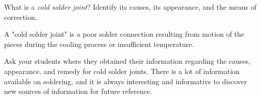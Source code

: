 

What is a {\it cold solder joint}?  Identify its causes, its appearance, and the means of correction.







A "cold solder joint" is a poor solder connection resulting from motion of the pieces during the cooling process or insufficient temperature.







Ask your students where they obtained their information regarding the causes, appearance, and remedy for cold solder joints.  There is a lot of information available on soldering, and it is always interesting and informative to discover new sources of information for future reference.




